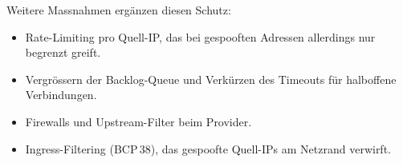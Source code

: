 \documentclass[
	fontsize=12pt,
	paper=a4,
	numbers=noenddot,
	listof=totoc,
	listof=entryprefix,
	listof=nochaptergap,
	bibliography=totoc,
	parskip=half,
	openany
]{scrbook}
\begin{document}
Weitere Massnahmen ergänzen diesen Schutz:

\begin{itemize}
	\item Rate-Limiting pro Quell-IP, das bei gespooften Adressen allerdings nur
	      begrenzt greift.
	\item Vergrössern der Backlog-Queue und Verkürzen des Timeouts für
	      halboffene Verbindungen.
	\item Firewalls und Upstream-Filter beim Provider.
	\item Ingress-Filtering (BCP\,38), das gespoofte Quell-IPs am Netzrand
	      verwirft.
\end{itemize}
\end{document}
